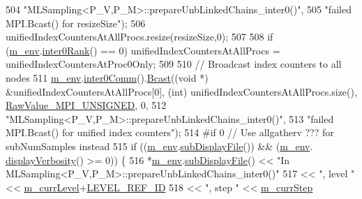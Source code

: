 \begin{DoxyCode}
504                            \textcolor{stringliteral}{"MLSampling<P\_V,P\_M>::prepareUnbLinkedChains\_inter0()"},
505                            \textcolor{stringliteral}{"failed MPI.Bcast() for resizeSize"});
506   unifiedIndexCountersAtAllProcs.resize(resizeSize,0);
507 
508   \textcolor{keywordflow}{if} (\hyperlink{class_q_u_e_s_o_1_1_m_l_sampling_a13f1ca4fe9f94822fe572a743eaced1d}{m\_env}.\hyperlink{class_q_u_e_s_o_1_1_base_environment_ae106b5bb8a80b655b88b3a26b1e7c185}{inter0Rank}() == 0) unifiedIndexCountersAtAllProcs = 
      unifiedIndexCountersAtProc0Only;
509 
510   \textcolor{comment}{// Broadcast index counters to all nodes}
511   \hyperlink{class_q_u_e_s_o_1_1_m_l_sampling_a13f1ca4fe9f94822fe572a743eaced1d}{m\_env}.\hyperlink{class_q_u_e_s_o_1_1_base_environment_a689e4d140c74d495d97eb498714a4b82}{inter0Comm}().\hyperlink{class_q_u_e_s_o_1_1_mpi_comm_abd6af8db8b0c7fd2f5b62e26477a9537}{Bcast}((\textcolor{keywordtype}{void} *) &unifiedIndexCountersAtAllProcs[0], (\textcolor{keywordtype}{int}) 
      unifiedIndexCountersAtAllProcs.size(), \hyperlink{_mpi_comm_8h_a06cbfbc33436f6e0dc8a48ff3c49bdfc}{RawValue\_MPI\_UNSIGNED}, 0,
512                            \textcolor{stringliteral}{"MLSampling<P\_V,P\_M>::prepareUnbLinkedChains\_inter0()"},
513                            \textcolor{stringliteral}{"failed MPI.Bcast() for unified index counters"});
514 \textcolor{preprocessor}{#if 0 // Use allgatherv ??? for subNumSamples instead}
515 \textcolor{preprocessor}{}  \textcolor{keywordflow}{if} ((\hyperlink{class_q_u_e_s_o_1_1_m_l_sampling_a13f1ca4fe9f94822fe572a743eaced1d}{m\_env}.\hyperlink{class_q_u_e_s_o_1_1_base_environment_a8a0064746ae8dddfece4229b9ad374d6}{subDisplayFile}()) && (\hyperlink{class_q_u_e_s_o_1_1_m_l_sampling_a13f1ca4fe9f94822fe572a743eaced1d}{m\_env}.
      \hyperlink{class_q_u_e_s_o_1_1_base_environment_a1fe5f244fc0316a0ab3e37463f108b96}{displayVerbosity}() >= 0)) \{
516     *\hyperlink{class_q_u_e_s_o_1_1_m_l_sampling_a13f1ca4fe9f94822fe572a743eaced1d}{m\_env}.\hyperlink{class_q_u_e_s_o_1_1_base_environment_a8a0064746ae8dddfece4229b9ad374d6}{subDisplayFile}() << \textcolor{stringliteral}{"In MLSampling<P\_V,P\_M>::prepareUnbLinkedChains\_inter0()"}
517                             << \textcolor{stringliteral}{", level "} << \hyperlink{class_q_u_e_s_o_1_1_m_l_sampling_af9416874c856e50f3b35270e801f17e4}{m\_currLevel}+\hyperlink{_m_l_sampling_level_options_8h_a68d15eaf394d210effcf584b938206d3}{LEVEL\_REF\_ID}
518                             << \textcolor{stringliteral}{", step "}  << \hyperlink{class_q_u_e_s_o_1_1_m_l_sampling_a1b1f8ccb4823bdfa26ec652f0807c63e}{m\_currStep}

\end{DoxyCode}

